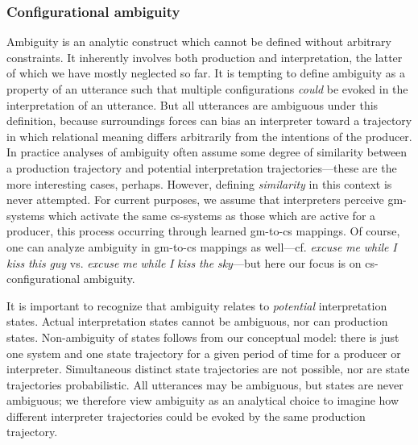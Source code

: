 \subsubsection{Configurational ambiguity}

Ambiguity is an analytic construct which cannot be defined without arbitrary constraints. It inherently  involves both production and interpretation, the latter of which we have mostly neglected so far. It is tempting to define ambiguity as a property of an utterance such that multiple configurations \textit{could} be evoked in the interpretation of an utterance. But all utterances are ambiguous under this definition, because surroundings forces can bias an interpreter toward a trajectory in which relational meaning differs arbitrarily from the intentions of the producer. In practice analyses of ambiguity often assume some degree of similarity between a production trajectory and potential interpretation trajectories—these are the more interesting cases, perhaps. However, defining \textit{similarity} in this context is never attempted. For current purposes, we assume that interpreters perceive gm-systems which activate the same cs-systems as those which are active for a producer, this process occurring through learned gm-to-cs mappings. Of course, one can analyze ambiguity in gm-to-cs mappings as well—cf. \textit{excuse} \textit{me} \textit{while} \textit{I} \textit{kiss} \textit{this} \textit{guy} vs. \textit{excuse} \textit{me} \textit{while} \textit{I} \textit{kiss} \textit{the} \textit{sky}—but here our focus is on cs-configurational ambiguity. 

  It is important to recognize that ambiguity relates to \textit{potential} interpretation states. Actual interpretation states cannot be ambiguous, nor can production states. Non-ambiguity of states follows from our conceptual model: there is just one system and one state trajectory for a given period of time for a producer or interpreter. Simultaneous distinct state trajectories are not possible, nor are state trajectories probabilistic. All utterances may be ambiguous, but states are never ambiguous; we therefore view ambiguity as an analytical choice to imagine how different interpreter trajectories could be evoked by the same production trajectory.

